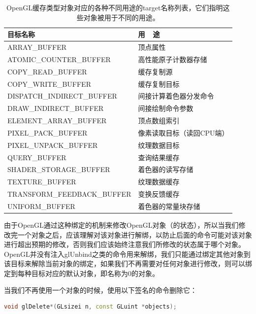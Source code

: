 \begin{table}
\caption{OpenGL缓存类型对象对应的各种不同用途的target名称列表，它们指明这些对象被用于不同的用途。}
\label{t:api-buffer-target}
\centering
\begin{tabular}{>{\small}p{}|>{\small}p{}}
\hline 
   目标名称 & 用~~途  \\
    \hline  
  ARRAY\_BUFFER                &顶点属性\\
  ATOMIC\_COUNTER\_BUFFER      &高性能原子计数器存储\\
  COPY\_READ\_BUFFER           &缓存复制源\\
  COPY\_WRITE\_BUFFER          &缓存复制目标\\
  DISPATCH\_INDIRECT\_BUFFER   &间接计算着色器分发命令\\
  DRAW\_INDIRECT\_BUFFER       &间接绘制命令参数\\
  ELEMENT\_ARRAY\_BUFFER       &顶点数组索引\\
  PIXEL\_PACK\_BUFFER          &像素读取目标（读回CPU端）\\
  PIXEL\_UNPACK\_BUFFER        &纹理数据目标\\
  QUERY\_BUFFER                &查询结果缓存\\
  SHADER\_STORAGE\_BUFFER      &着色器的读写存储\\
  TEXTURE\_BUFFER              &纹理数据缓存\\
  TRANSFORM\_FEEDBACK\_BUFFER  &变换反馈缓存\\
  UNIFORM\_BUFFER              &着色器的常量块存储\\

 \hline 
\end{tabular}
\end{table}




由于OpenGL通过这种绑定的机制来修改OpenGL对象（的状态），所以当我们修改完一个对象之后，应该理解对该对象进行解绑，以防止后面的命令可能对该对象进行超出预期的修改，否则我们应该始终注意我们所修改的状态属于哪个对象。OpenGL并没有注入glUnbind之类的命令用来解绑，我们只能通过绑定其他对象到该目标来解除当前对象的绑定，如果我们不再需要对任何对象进行修改，则可以绑定到每种目标对应的默认对象，即名称为0的对象。

当我们不再使用一个对象的时候，使用以下签名的命令删除它：

\begin{lstlisting}[language=C++]
void glDelete*(GLsizei n​, const GLuint *objects​);
\end{lstlisting}

